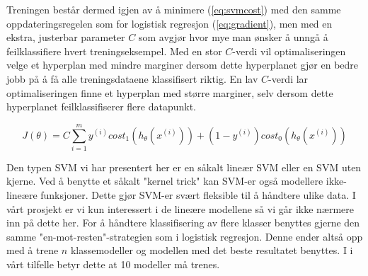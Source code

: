 {Treningen består dermed igjen av å minimere (\ref{eq:svmcost}) med den samme oppdateringsregelen som for logistisk regresjon (\ref{eq:gradient}), men med en ekstra, justerbar parameter $C$ som avgjør hvor mye man ønsker å unngå å feilklassifiere hvert treningseksempel. Med en stor $C$-verdi vil optimaliseringen velge et hyperplan med mindre marginer dersom dette hyperplanet gjør en bedre jobb på å få alle treningsdataene klassifisert riktig. En lav $C$-verdi lar optimaliseringen finne et hyperplan med større marginer, selv dersom dette hyperplanet feilklassifiserer flere datapunkt.

\begin{equation}
J(\theta) = 
    C \sum_{i=1}^{m} y^{(i)}cost_1(h_\theta(x^{(i)})) + (1-y^{(i)})cost_0(h_\theta(x^{(i)}))
\label{eq:svmcost}
\end{equation}

Den typen SVM vi har presentert her er en såkalt lineær SVM eller en SVM uten kjerne. Ved å benytte et såkalt "kernel trick" kan SVM-er også modellere ikke-lineære funksjoner. Dette gjør SVM-er svært fleksible til å håndtere ulike data. I vårt prosjekt er vi kun interessert i de lineære modellene så vi går ikke nærmere inn på dette her. For å håndtere klassifisering av flere klasser benyttes gjerne den samme "en-mot-resten"-strategien som i logistisk regresjon. Denne ender altså opp med å trene $n$ klassemodeller og modellen med det beste resultatet benyttes. I i vårt tilfelle betyr dette at 10 modeller må trenes.
}

